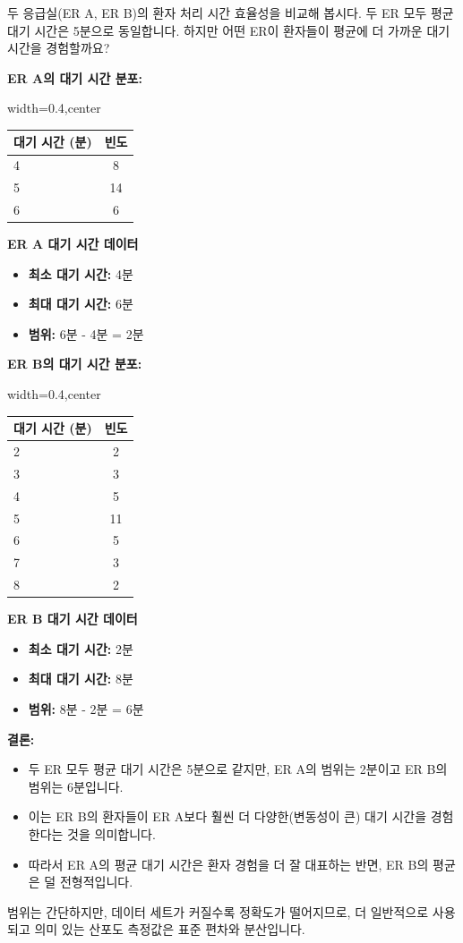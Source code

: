 \documentclass[11pt,a4paper]{book}
\providecommand{\captionof}[2]{\textbf{#2}}
\theoremstyle{definition}
\begin{document}
\begin{examplebox}[title=예시: 응급실 (ER) 대기 시간 비교]
두 응급실(ER A, ER B)의 환자 처리 시간 효율성을 비교해 봅시다. 두 ER 모두 평균 대기 시간은 5분으로 동일합니다.
하지만 어떤 ER이 환자들이 평균에 더 가까운 대기 시간을 경험할까요?

\textbf{ER A의 대기 시간 분포:}
\begin{adjustbox}{width=0.4\textwidth,center}
\begin{tabular}{lc}
\toprule
\textbf{대기 시간 (분)} & \textbf{빈도} \\
\midrule
4 & 8 \\
5 & 14 \\
6 & 6 \\
\bottomrule
\end{tabular}
\end{adjustbox}
\captionof{table}{ER A 대기 시간 데이터}
\label{tab:er_a_waiting_time}
\begin{itemize}
    \item \textbf{최소 대기 시간:} 4분
    \item \textbf{최대 대기 시간:} 6분
    \item \textbf{범위:} 6분 - 4분 = 2분
\end{itemize}

\textbf{ER B의 대기 시간 분포:}
\begin{adjustbox}{width=0.4\textwidth,center}
\begin{tabular}{lc}
\toprule
\textbf{대기 시간 (분)} & \textbf{빈도} \\
\midrule
2 & 2 \\
3 & 3 \\
4 & 5 \\
5 & 11 \\
6 & 5 \\
7 & 3 \\
8 & 2 \\
\bottomrule
\end{tabular}
\end{adjustbox}
\captionof{table}{ER B 대기 시간 데이터}
\label{tab:er_b_waiting_time}
\begin{itemize}
    \item \textbf{최소 대기 시간:} 2분
    \item \textbf{최대 대기 시간:} 8분
    \item \textbf{범위:} 8분 - 2분 = 6분
\end{itemize}

\textbf{결론:}
\begin{itemize}
    \item 두 ER 모두 평균 대기 시간은 5분으로 같지만, ER A의 범위는 2분이고 ER B의 범위는 6분입니다.
    \item 이는 ER B의 환자들이 ER A보다 훨씬 더 다양한(변동성이 큰) 대기 시간을 경험한다는 것을 의미합니다.
    \item 따라서 ER A의 평균 대기 시간은 환자 경험을 더 잘 대표하는 반면, ER B의 평균은 덜 전형적입니다.
\end{itemize}
범위는 간단하지만, 데이터 세트가 커질수록 정확도가 떨어지므로, 더 일반적으로 사용되고 의미 있는 산포도 측정값은 표준 편차와 분산입니다.
\end{examplebox}
\end{document}
